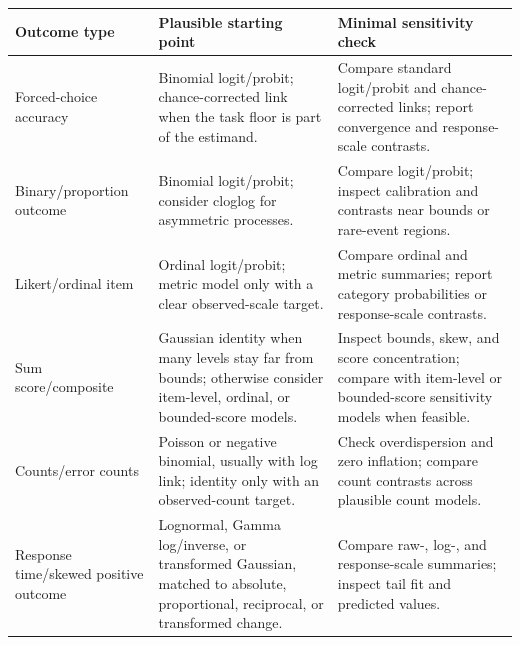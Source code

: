\documentclass[
  man,
  longtable,
  nolmodern,
  notxfonts,
  notimes,
  colorlinks=true,linkcolor=blue,citecolor=blue,urlcolor=blue]{apa7}
\begin{document}
\begin{table}

{\caption{{Practical starting points for link-aware interaction testing
across common psychological outcomes.}{\label{tbl-link-aware-workflow}}}
\vspace{-20pt}}

\begin{longtable}[]{@{}
  >{\raggedright\arraybackslash}p{}
  >{\raggedright\arraybackslash}p{}
  >{\raggedright\arraybackslash}p{}@{}}
\toprule\noalign{}
\begin{minipage}[b]{\linewidth}\raggedright
Outcome type
\end{minipage} & \begin{minipage}[b]{\linewidth}\raggedright
Plausible starting point
\end{minipage} & \begin{minipage}[b]{\linewidth}\raggedright
Minimal sensitivity check
\end{minipage} \\
\midrule\noalign{}
\endhead
\bottomrule\noalign{}
\endlastfoot
Forced-choice accuracy & Binomial logit/probit; chance-corrected link
when the task floor is part of the estimand. & Compare standard
logit/probit and chance-corrected links; report convergence and
response-scale contrasts. \\
Binary/proportion outcome & Binomial logit/probit; consider cloglog for
asymmetric processes. & Compare logit/probit; inspect calibration and
contrasts near bounds or rare-event regions. \\
Likert/ordinal item & Ordinal logit/probit; metric model only with a
clear observed-scale target. & Compare ordinal and metric summaries;
report category probabilities or response-scale contrasts. \\
Sum score/composite & Gaussian identity when many levels stay far from
bounds; otherwise consider item-level, ordinal, or bounded-score models.
& Inspect bounds, skew, and score concentration; compare with item-level
or bounded-score sensitivity models when feasible. \\
Counts/error counts & Poisson or negative binomial, usually with log
link; identity only with an observed-count target. & Check
overdispersion and zero inflation; compare count contrasts across
plausible count models. \\
Response time/skewed positive outcome & Lognormal, Gamma log/inverse, or
transformed Gaussian, matched to absolute, proportional, reciprocal, or
transformed change. & Compare raw-, log-, and response-scale summaries;
inspect tail fit and predicted values. \\
\end{longtable}

\end{table}
\end{document}
